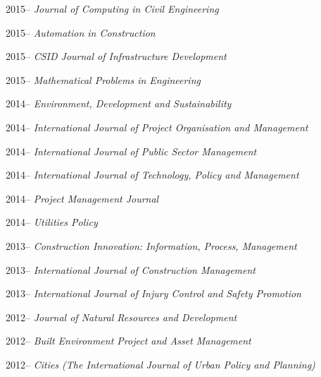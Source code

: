 \documentclass[11pt,a4paper]{report} %
\begin{document}
\begin{tablist}
        \item[2015--] \tab{}\textit{Journal of Computing in Civil Engineering}
        
        \item[2015--] \tab{}\textit{Automation in Construction}
        
        \item[2015--] \tab{}\textit{CSID Journal of Infrastructure Development}
        
        \item[2015--] \tab{}\textit{Mathematical Problems in Engineering}
        
        \item[2014--] \tab{}\textit{Environment, Development and Sustainability}
        
        \item[2014--] \tab{}\textit{International Journal of Project Organisation and Management}
        
        \item[2014--] \tab{}\textit{International Journal of Public Sector Management}
        
        \item[2014--] \tab{}\textit{International Journal of Technology, Policy and Management}
        
        \item[2014--] \tab{}\textit{Project Management Journal}
        
        \item[2014--] \tab{}\textit{Utilities Policy}
        
        \item[2013--] \tab{}\textit{Construction Innovation: Information, Process, Management}
        
        \item[2013--] \tab{}\textit{International Journal of Construction Management}
        
        \item[2013--] \tab{}\textit{International Journal of Injury Control and Safety Promotion}
        
        \item[2012--] \tab{}\textit{Journal of Natural Resources and Development}
        
        \item[2012--] \tab{}\textit{Built Environment Project and Asset Management}
        
        \item[2012--] \tab{}\textit{Cities (The International Journal of Urban Policy and Planning)}
        

\end{tablist}
\end{document}
